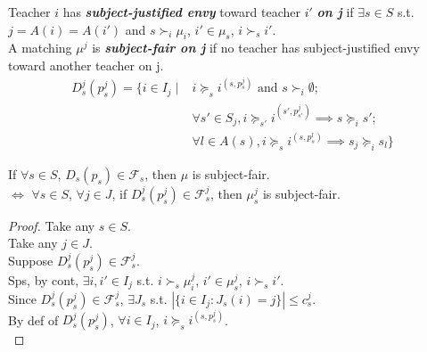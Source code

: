 \documentclass[a4j,10pt]{jsarticle}
\theoremstyle{definition}
\theoremstyle{remark}
\theoremstyle{plain}
\begin{document}
\begin{tcolorbox}
  Teacher $i$ has {\bf \emph{subject-justified envy}} toward teacher $i'$ {\bf \emph{on j}} if $\exists s \in S $ s.t. $j = A(i) = A(i')$ and $s \succ_i \mu_i$, $i' \in \mu_s$, $i \succ_s i'$.\\
  A matching $\mu^j$ is {\bf \emph{subject-fair on j}} if no teacher has subject-justified envy toward another teacher on j.\\
  \begin{align*}
    D^j_s(p_s^j) = \{ i \in I_j \mid &i \succeq_s i^{(s,p^j_s)} \text{ and } s \succ_i \emptyset ;\\ &\forall s' \in S_j, i \succeq_{s'} i^{(s',p^j_{s'})} \implies s \succeq_i s' ;\\ &\forall l \in A(s), i \succeq_{s} i^{(s,p^l_{s})} \implies s_j \succeq_i s_l\}
  \end{align*}
  

  If $\forall s \in S$, $D_s(p_s) \in \mathcal{F}_s$, then $\mu$ is subject-fair.\\
  $\Leftrightarrow$ $\forall s \in S$, $\forall j \in J$, if $D_s^j(p_s^j) \in \mathcal{F}_s^j$, then $\mu_s^j$ is subject-fair.\\

  \begin{proof}
    Take any $s \in S$.\\
    Take any $j \in J$.\\
    Suppose $D_s^j(p_s^j) \in \mathcal{F}_s^j$.\\
    Sps, by cont, $\exists i,i' \in I_j$ s.t. $i \succ_s \mu^j_i$, $i' \in \mu^j_s$, $i \succ_s i'$.\\
    Since $D_s^j(p_s^j) \in \mathcal{F}_s^j$, $\exists J_s$ s.t. $|\{i \in I_j : J_s(i) = j\}| \leq c_s^j$.\\
    By def of $D_s^j(p_s^j)$, $\forall i \in I_j$, $i \succeq_s i^{(s,p^j_s)}$.\\
  \end{proof}
\end{tcolorbox}
\end{document}
